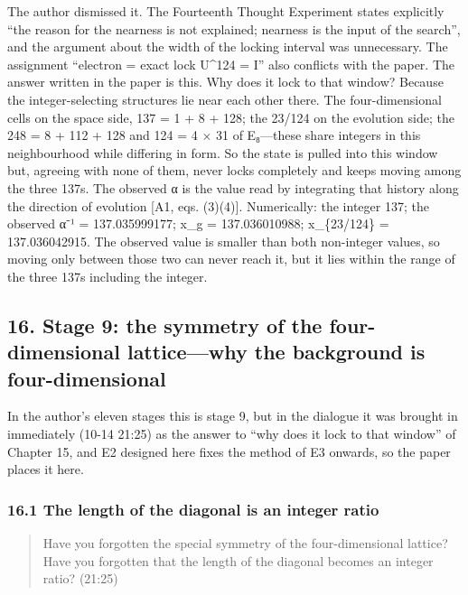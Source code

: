 \documentclass[
  a4paper,
]{article}
\newcounter{none} %
\begin{document}
The author dismissed it. The Fourteenth Thought Experiment states
explicitly ``the reason for the nearness is not explained; nearness is
the input of the search'', and the argument about the width of the
locking interval was unnecessary. The assignment ``electron = exact lock
U\^{}124 = I'' also conflicts with the paper. The answer written in the
paper is this. Why does it lock to that window? Because the
integer-selecting structures lie near each other there. The
four-dimensional cells on the space side, 137 = 1 + 8 + 128; the 23/124
on the evolution side; the 248 = 8 + 112 + 128 and 124 = 4 × 31 of
E₈---these share integers in this neighbourhood while differing in form.
So the state is pulled into this window but, agreeing with none of them,
never locks completely and keeps moving among the three 137s. The
observed α is the value read by integrating that history along the
direction of evolution {[}A1, eqs. (3)(4){]}. Numerically: the integer
137; the observed α⁻¹ = 137.035999177; x\_g = 137.036010988;
x\_\{23/124\} = 137.036042915. The observed value is smaller than both
non-integer values, so moving only between those two can never reach it,
but it lies within the range of the three 137s including the integer.

\subsection{16. Stage 9: the symmetry of the four-dimensional
lattice---why the background is
four-dimensional}\label{stage-9-the-symmetry-of-the-four-dimensional-latticewhy-the-background-is-four-dimensional}

In the author's eleven stages this is stage 9, but in the dialogue it
was brought in immediately (10-14 21:25) as the answer to ``why does it
lock to that window'' of Chapter 15, and E2 designed here fixes the
method of E3 onwards, so the paper places it here.

\subsubsection{16.1 The length of the diagonal is an integer
ratio}\label{the-length-of-the-diagonal-is-an-integer-ratio}

\begin{quote}
Have you forgotten the special symmetry of the four-dimensional lattice?
Have you forgotten that the length of the diagonal becomes an integer
ratio? (21:25)
\end{quote}
\end{document}
